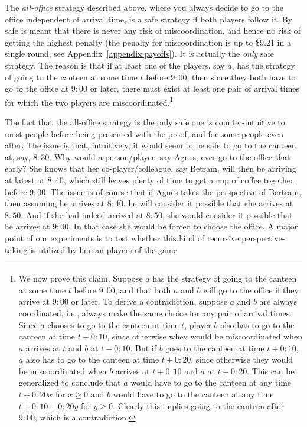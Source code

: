 The \emph{all-office} strategy described above, where you always decide to go to the office independent of arrival time, is a safe strategy if both players follow it. By safe is meant that there is never any risk of miscoordination, and hence no risk of getting the highest penalty (the penalty for miscoordination is up to \$9.21 in a single round, see Appendix~\ref{appendix:payoffs}). It is actually the \emph{only} safe strategy. The reason is that if at least one of the players, say $a$, has the strategy of going to the canteen at some time $t$ before $9{:}00$, then since they both have to go to the office at $9{:}00$ or later, there must exist at least one pair of arrival times for which the two players are miscoordinated.\footnote{
\label{footnote:no-cutoff}  
We now prove this claim. Suppose $a$ has the strategy of going to the canteen at some time $t$ before $9{:}00$, and that both $a$ and $b$ will go to the office if they arrive at $9{:}00$ or later. To derive a contradiction, suppose $a$ and $b$ are always coordinated, i.e., always make the same choice for any pair of arrival times. Since $a$ chooses to go to the canteen at time $t$, player $b$ also has to go to the canteen at time $t+0{:}10$, since otherwise whey would be miscoordinated when $a$ arrives at $t$ and $b$ at $t+0{:}10$. But if $b$ goes to the canteen at time $t+0{:}10$, $a$ also has to go to the canteen at time $t+0{:}20$, since otherwise they would be miscoordinated when $b$ arrives at $t+0{:}10$ and $a$ at $t+0{:}20$. This can be generalized to conclude  that $a$ would have to go to the canteen at any time $t+0{:}20x$ for $x \geq 0$ and $b$ would have to go to the canteen at any time $t+0{:}10+0{:}20y$ for $y \geq 0$. Clearly this implies going to the canteen after $9{:}00$, which is a contradiction.}

The fact that the all-office strategy is the only safe one is counter-intuitive to most people before being presented with the proof, and for some people even after. The issue is that, intuitively, it would seem to be safe to go to the canteen at, say, $8{:}30$. Why would a person/player, say Agnes, ever go to the office that early? She knows that her co-player/colleague, say Betram, will then be arriving at latest at $8{:}40$, which still leaves plenty of time to get a cup of coffee together before $9{:}00$. The issue is of course that if Agnes takes the perspective of Bertram, then assuming he arrives at $8{:}40$, he will consider it possible that she arrives at $8{:}50$. And if she had indeed arrived at $8{:}50$, she would consider it possible that he arrives at $9{:}00$. In that case she would be forced to choose the office. A major point of our experiments is to test whether this kind of recursive perspective-taking is utilized by human players of the game.

